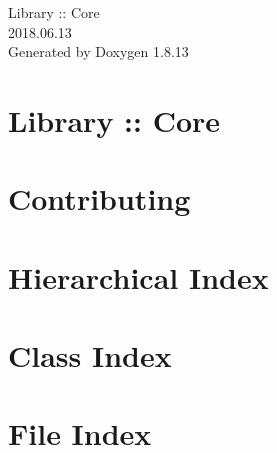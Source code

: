 \documentclass[twoside]{book}
\newcommand{\+}{\discretionary{\mbox{\scriptsize$\hookleftarrow$}}{}{}}
\newcommand{\clearemptydoublepage}{%
  \newpage{\pagestyle{empty}\cleardoublepage}%
}
\begin{document}
\hypersetup{pageanchor=false,
             bookmarksnumbered=true,
             pdfencoding=unicode
            }
\begin{titlepage}
\vspace*{7cm}
\begin{center}%
{\Large Library \+:\+: Core \\[1ex]\large 2018.\+06.\+13 }\\
\vspace*{1cm}
{\large Generated by Doxygen 1.8.13}\\
\end{center}
\end{titlepage}
\clearemptydoublepage
{}
\tableofcontents
\clearemptydoublepage
{}
\hypersetup{pageanchor=true}

\chapter{Library \+:\+: Core}
\label{index}\hypertarget{index}{}
\chapter{Contributing}
\label{md__c_o_n_t_r_i_b_u_t_i_n_g}

\chapter{Hierarchical Index}

\chapter{Class Index}

\chapter{File Index}

\end{document}
